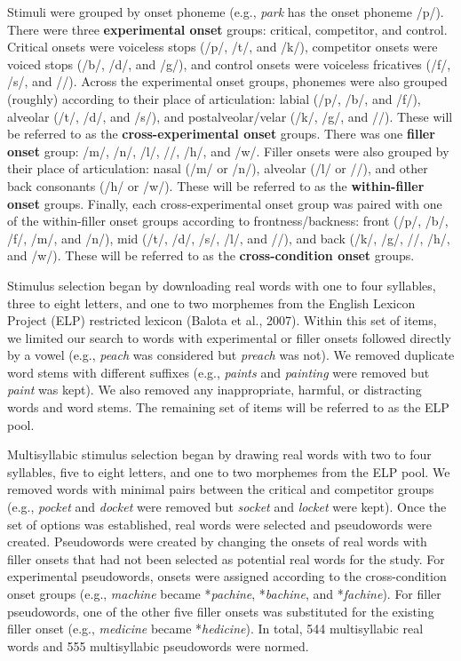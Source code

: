 \documentclass[
  12pt,
  twoside]{article}
\begin{document}
Stimuli were grouped by onset phoneme (e.g., \emph{park} has the onset phoneme /p/).
There were three \textbf{experimental onset} groups: critical, competitor, and control.
Critical onsets were voiceless stops (/p/, /t/, and /k/), competitor onsets were voiced stops (/b/, /d/, and /g/), and control onsets were voiceless fricatives (/f/, /s/, and //).
Across the experimental onset groups, phonemes were also grouped (roughly) according to their place of articulation: labial (/p/, /b/, and /f/), alveolar (/t/, /d/, and /s/), and postalveolar/velar (/k/, /g/, and //).
These will be referred to as the \textbf{cross-experimental onset} groups.
There was one \textbf{filler onset} group: /m/, /n/, /l/, //, /h/, and /w/.
Filler onsets were also grouped by their place of articulation: nasal (/m/ or /n/), alveolar (/l/ or //), and other back consonants (/h/ or /w/).
These will be referred to as the \textbf{within-filler onset} groups.
Finally, each cross-experimental onset group was paired with one of the within-filler onset groups according to frontness/backness: front (/p/, /b/, /f/, /m/, and /n/), mid (/t/, /d/, /s/, /l/, and //), and back (/k/, /g/, //, /h/, and /w/).
These will be referred to as the \textbf{cross-condition onset} groups.

Stimulus selection began by downloading real words with one to four syllables, three to eight letters, and one to two morphemes from the English Lexicon Project (ELP) restricted lexicon (Balota et al., 2007).
Within this set of items, we limited our search to words with experimental or filler onsets followed directly by a vowel (e.g., \emph{peach} was considered but \emph{preach} was not).
We removed duplicate word stems with different suffixes (e.g., \emph{paints} and \emph{painting} were removed but \emph{paint} was kept).
We also removed any inappropriate, harmful, or distracting words and word stems.
The remaining set of items will be referred to as the ELP pool.

Multisyllabic stimulus selection began by drawing real words with two to four syllables, five to eight letters, and one to two morphemes from the ELP pool.
We removed words with minimal pairs between the critical and competitor groups (e.g., \emph{pocket} and \emph{docket} were removed but \emph{socket} and \emph{locket} were kept).
Once the set of options was established, real words were selected and pseudowords were created.
Pseudowords were created by changing the onsets of real words with filler onsets that had not been selected as potential real words for the study.
For experimental pseudowords, onsets were assigned according to the cross-condition onset groups (e.g., \emph{machine} became *\emph{pachine}, *\emph{bachine}, and *\emph{fachine}).
For filler pseudowords, one of the other five filler onsets was substituted for the existing filler onset (e.g., \emph{medicine} became *\emph{hedicine}).
In total, 544 multisyllabic real words and 555 multisyllabic pseudowords were normed.
\end{document}
